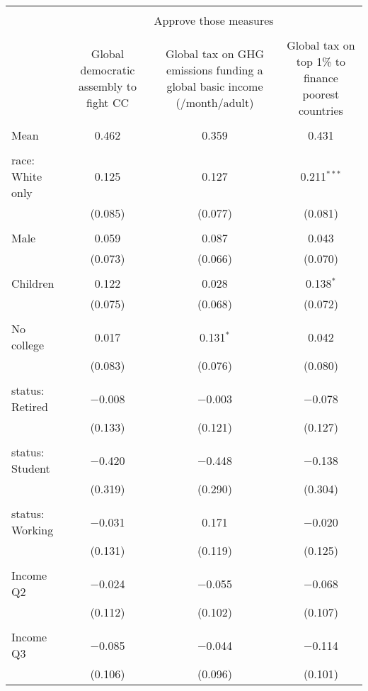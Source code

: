 
\begin{tabular}{@{\extracolsep{5pt}}lccc} 
\\[-1.8ex]\hline 
\hline \\[-1.8ex] 
 & \multicolumn{3}{c}{Approve those measures} \\ 
\cline{2-4} 
\\[-1.8ex] & Global democratic assembly to fight CC & Global tax on GHG emissions funding a global basic income (\textdollar 30/month/adult) & Global tax on top 1\% to finance poorest countries \\ 
\hline \\[-1.8ex] 
 Mean & 0.462 & 0.359 & 0.431  \\ \hline \\[-1.8ex] race: White only & 0.125 & 0.127 & 0.211$^{***}$ \\ 
  & (0.085) & (0.077) & (0.081) \\ 
  & & & \\ 
 Male & 0.059 & 0.087 & 0.043 \\ 
  & (0.073) & (0.066) & (0.070) \\ 
  & & & \\ 
 Children & 0.122 & 0.028 & 0.138$^{*}$ \\ 
  & (0.075) & (0.068) & (0.072) \\ 
  & & & \\ 
 No college & 0.017 & 0.131$^{*}$ & 0.042 \\ 
  & (0.083) & (0.076) & (0.080) \\ 
  & & & \\ 
 status: Retired & $-$0.008 & $-$0.003 & $-$0.078 \\ 
  & (0.133) & (0.121) & (0.127) \\ 
  & & & \\ 
 status: Student & $-$0.420 & $-$0.448 & $-$0.138 \\ 
  & (0.319) & (0.290) & (0.304) \\ 
  & & & \\ 
 status: Working & $-$0.031 & 0.171 & $-$0.020 \\ 
  & (0.131) & (0.119) & (0.125) \\ 
  & & & \\ 
 Income Q2 & $-$0.024 & $-$0.055 & $-$0.068 \\ 
  & (0.112) & (0.102) & (0.107) \\ 
  & & & \\ 
 Income Q3 & $-$0.085 & $-$0.044 & $-$0.114 \\ 
  & (0.106) & (0.096) & (0.101) \\ 

\end{tabular}
